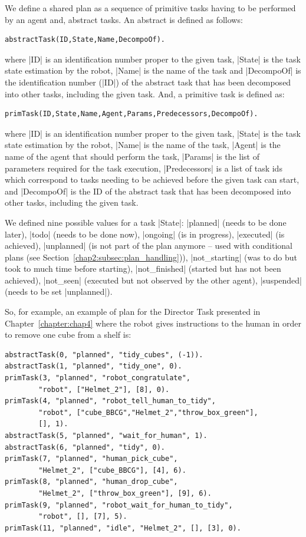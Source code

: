 \documentclass[a4paper,11pt,twoside]{StyleThese}
\begin{document}
We define a shared plan as a sequence of primitive tasks having to be performed by an agent and, abstract tasks. An abstract is defined as follows: 
\begin{lstlisting}[style=aslDef]
	abstractTask(ID,State,Name,DecompoOf).
\end{lstlisting}
\noindent
where |ID| is an identification number proper to the given task, |State| is the task state estimation by the robot, |Name| is the name of the task and |DecompoOf| is the identification number (|ID|) of the abstract task that has been decomposed into other tasks, including the given task.
\noindent
And, a primitive task is defined as:
\begin{lstlisting}[style=aslDef]
	primTask(ID,State,Name,Agent,Params,Predecessors,DecompoOf).
\end{lstlisting}
\noindent
where |ID| is an identification number proper to the given task, |State| is the task state estimation by the robot, |Name| is the name of the task, |Agent| is the name of the agent that should perform the task, |Params| is the list of parameters required for the task execution, |Predecessors| is a list of task ids which correspond to tasks needing to be achieved before the given task can start, and |DecompoOf| is the ID of the abstract task that has been decomposed into other tasks, including the given task.

We defined nine possible values for a task |State|: |planned| (needs to be done later), |todo| (needs to be done now), |ongoing| (is in progress), |executed| (is achieved), |unplanned| (is not part of the plan anymore -- used with conditional plans (see Section~\ref{chap2:subsec:plan_handling})), |not_starting| (was to do but took to much time before starting), |not_finished| (started but has not been achieved), |not_seen| (executed but not observed by the other agent), |suspended| (needs to be set |unplanned|).

So, for example, an example of plan for the Director Task presented in Chapter~\ref{chapter:chap4} where the robot gives instructions to the human in order to remove one cube from a shelf is:
\begin{lstlisting}[style=aslDef]
abstractTask(0, "planned", "tidy_cubes", (-1)). 
abstractTask(1, "planned", "tidy_one", 0). 
primTask(3, "planned", "robot_congratulate", 
		"robot", ["Helmet_2"], [8], 0).
primTask(4, "planned", "robot_tell_human_to_tidy", 
		"robot", ["cube_BBCG","Helmet_2","throw_box_green"], 
		[], 1).
abstractTask(5, "planned", "wait_for_human", 1).
abstractTask(6, "planned", "tidy", 0).
primTask(7, "planned", "human_pick_cube",
		"Helmet_2", ["cube_BBCG"], [4], 6).
primTask(8, "planned", "human_drop_cube", 
		"Helmet_2", ["throw_box_green"], [9], 6).
primTask(9, "planned", "robot_wait_for_human_to_tidy", 
		"robot", [], [7], 5).
primTask(11, "planned", "idle", "Helmet_2", [], [3], 0).
\end{lstlisting}
\end{document}
